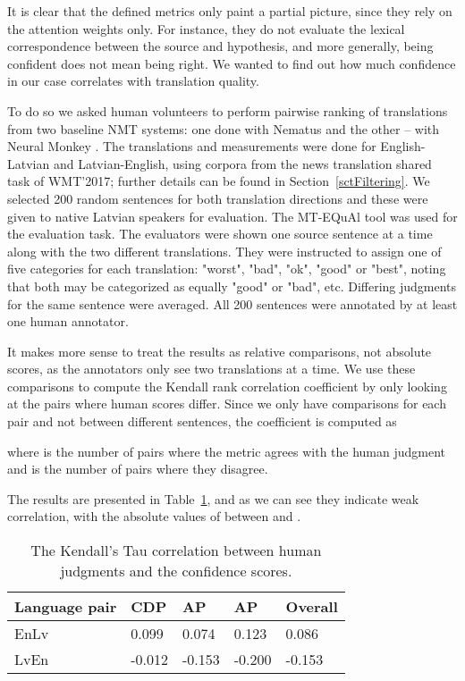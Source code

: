 \documentclass[]{article}
\begin{document}
It is clear that the defined metrics only paint a partial picture, since they rely on the attention weights only. For instance, they do not evaluate the lexical correspondence between the source and hypothesis, and more generally, being confident does not mean being right. We wanted to find out how much confidence in our case correlates with translation quality.

To do so we asked human volunteers to perform pairwise ranking of translations from two baseline NMT systems: one done with Nematus \citep{sennrich2017nematus} and the other -- with Neural Monkey \citep{helcl2017neural}. The translations and measurements were done for English-Latvian and Latvian-English, using corpora from the news translation shared task of WMT'2017; further details can be found in Section~\ref{sctFiltering}. We selected 200 random sentences for both translation directions and these were given to native Latvian speakers for evaluation. The MT-EQuAl \citep{Girardi2014} tool was used for the evaluation task. The evaluators were shown one source sentence at a time along with the two different translations. They were instructed to assign one of five categories for each translation: "worst", "bad", "ok", "good" or "best", noting that both may be categorized as equally "good" or "bad", etc. Differing judgments for the same sentence were averaged. All 200 sentences were annotated by at least one human annotator.

It makes more sense to treat the results as relative comparisons, not absolute scores, as the annotators only see two translations at a time. We use these comparisons to compute the Kendall rank correlation coefficient \citep{kendallTau} by only looking at the pairs where human scores differ. Since we only have comparisons for each pair and not between different sentences, the coefficient is computed as

where  is the number of pairs where the metric agrees with the human judgment and  is the number of pairs where they disagree.

The results are presented in Table~\ref{tblCorrelations}, and as we can see they indicate weak correlation, with the absolute values of  between  and .
\begin{table}[h]
\begin{center}
\begin{tabular}{|l|l|l|l|l|}
\hline
Language pair & CDP & AP & AP & Overall \\
\hline
EnLv & 0.099 & 0.074 & 0.123 & 0.086 \\
LvEn & -0.012 & -0.153 & -0.200 & -0.153 \\
\hline
\end{tabular}
\end{center}
\caption{The Kendall's Tau correlation between human judgments and the confidence scores.}
\label{tblCorrelations}
\end{table}
\end{document}
